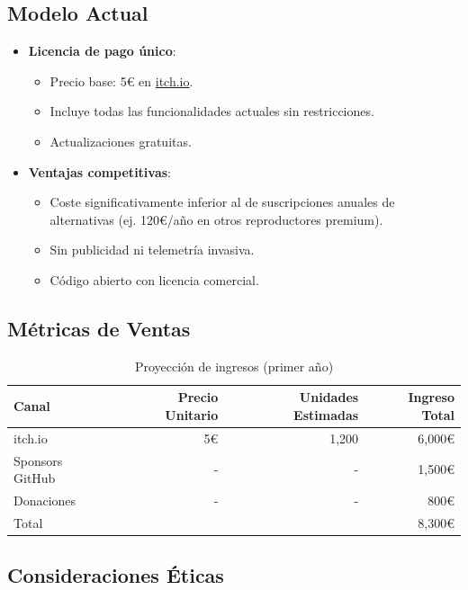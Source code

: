 \documentclass[11pt, a4paper]{article}
\begin{document}
  \subsection{Modelo Actual}

  \begin{itemize}
    \item \textbf{Licencia de pago único}:
      \begin{itemize}
        \item Precio base: 5€ en \href{https://musy.itch.io}{itch.io}.
        \item Incluye todas las funcionalidades actuales sin restricciones.
        \item Actualizaciones gratuitas.
      \end{itemize}

    \item \textbf{Ventajas competitivas}:
      \begin{itemize}
        \item Coste significativamente inferior al de suscripciones anuales de alternativas (ej. 120€/año en otros reproductores premium).
        \item Sin publicidad ni telemetría invasiva.
        \item Código abierto con licencia comercial.
      \end{itemize}
  \end{itemize}

  \subsection{Métricas de Ventas}

  \begin{table}[h]
    \centering
    \caption{Proyección de ingresos (primer año)}
    \begin{tabular}{lrrr}
      \hline
      Canal & Precio Unitario & Unidades Estimadas & Ingreso Total \\
      \hline
      itch.io & 5€ & 1,200 & 6,000€ \\
      Sponsors GitHub & - & - & 1,500€ \\
      Donaciones & - & - & 800€ \\
      \hline
      Total & & & 8,300€ \\
      \hline
    \end{tabular}
    \label{tab:ingresos}
  \end{table}

  \subsection{Consideraciones Éticas}
\end{document}
